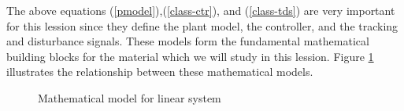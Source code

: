 \documentclass[a4paper]{article}
\theoremstyle{plain} %
{\theorembodyfont{\normalfont}
\newtheorem{Exa}{Example}}
\begin{document}
The above equations (\ref{pmodel}),(\ref{class-ctr}), and
(\ref{class-tds}) are very important for this lession since they
define the plant model, the controller, and the tracking and
disturbance signals. These models form the fundamental
mathematical building blocks for the material which we will study
in this lession. Figure \ref{model-ls} illustrates the
relationship between these mathematical models.

\begin{figure}[h]
\caption{Mathematical model for linear system} %
\label{model-ls}
\end{figure}
\end{document}
